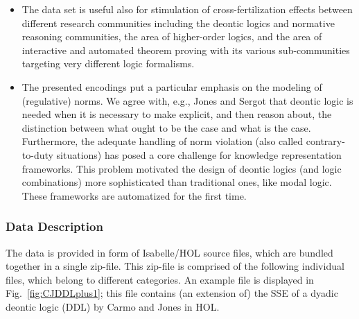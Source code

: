 \documentclass{article}
\newcommand{\comment}[1]{
}
\begin{document}
\begin{itemize}
\item The data set is useful also for stimulation of
  cross-fertilization effects between different research communities including
  the deontic logics  and normative reasoning communities,
  the area of higher-order logics, and the area of  interactive
  and automated theorem proving with its various sub-communities targeting
  very different logic formalisms.

\item The presented encodings put a particular emphasis on the
  modeling of (regulative) norms. We agree with, e.g., Jones and
  Sergot \cite{Jones1992-JONDLI} that deontic logic is needed when it is necessary to make
  explicit, and then reason about, the distinction between what ought
  to be the case and what is the case. Furthermore, the adequate
  handling of norm violation (also called contrary-to-duty situations)
  has posed a core challenge for knowledge representation
  frameworks. This problem motivated the design of deontic logics (and logic combinations) more sophisticated than traditional ones, like modal logic. These frameworks are automatized for the first time. 


\end{itemize}

\comment{
[Provide 3-6 bullet points explaining why these data are of value to the scientific community. Bullet points 1-3 must specifically answer the question in red next to the bullet point, but do not include the question itself in your answer (i.e. for the first bullet, you should explain why these data are useful but delete the “Why are these data useful?” question text itself). You may provide up to 3 additional bullet points to outline the value of these data. Please keep points brief.
·	Why are these data useful?
·	Who can benefit from these data?
·	How can these data be used for further insights and development of experiments?
·	 What is the additional value of these data?
·	…
·	…]
}

\subsubsection*{Data Description}
The data is provided in form of Isabelle/HOL source files, which are
bundled together in a single zip-file. This zip-file is comprised of
the following individual files, which belong to different
categories. An example file is displayed in Fig.~\ref{fig:CJDDLplus1}; this
file contains (an extension of) the SSE of 
 a dyadic deontic logic (DDL) by Carmo and Jones \cite{CJ13} in HOL. 
\end{document}
